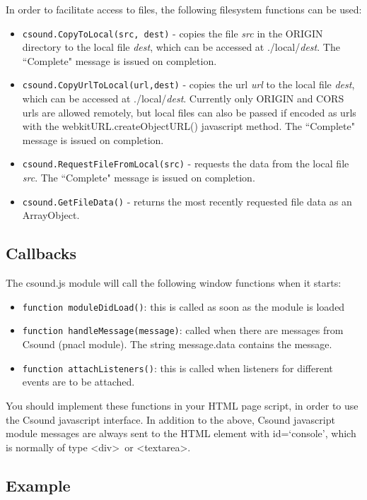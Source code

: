 \documentclass[11pt]{article}
\begin{document}
In order to facilitate access to files, the following filesystem functions can be used:

\begin{itemize}
\item {\tt csound.CopyToLocal(src, dest)} - copies the file \emph{src} in the ORIGIN directory to the local file \emph{dest}, which can
be accessed at ./local/\emph{dest}. The ``Complete" message is issued on completion.
\item {\tt csound.CopyUrlToLocal(url,dest)} - copies the url \emph{url} to the local file \emph{dest}, which can
be accessed at ./local/\emph{dest}. Currently only ORIGIN and CORS urls are allowed remotely, but local files can
also be passed if encoded as urls with the webkitURL.createObjectURL() javascript method. The ``Complete" message is issued on completion.
\item {\tt csound.RequestFileFromLocal(src)} - requests the data from the local file \emph{src}. The ``Complete" message is issued on completion. 
\item {\tt csound.GetFileData()} - returns the most recently requested file data as an ArrayObject.
\end{itemize}


\subsection{Callbacks}

The csound.js module will call the following window functions when it starts:

\begin{itemize} 
\item {\tt function moduleDidLoad()}: this is called as soon as the module is loaded 
\item {\tt function handleMessage(message)}: called when there are messages from Csound (pnacl module). 
The string message.data contains the message.
\item {\tt function attachListeners()}: this is called when listeners for different events are to be attached. 
\end{itemize}

You should implement these functions in your HTML page script, in order to use the Csound javascript interface.
In addition to the above, Csound javascript module messages are always sent to the HTML element with id=`console', 
which is normally of type \textless div\textgreater \, or \textless textarea\textgreater .

\subsection{Example}
\end{document}

